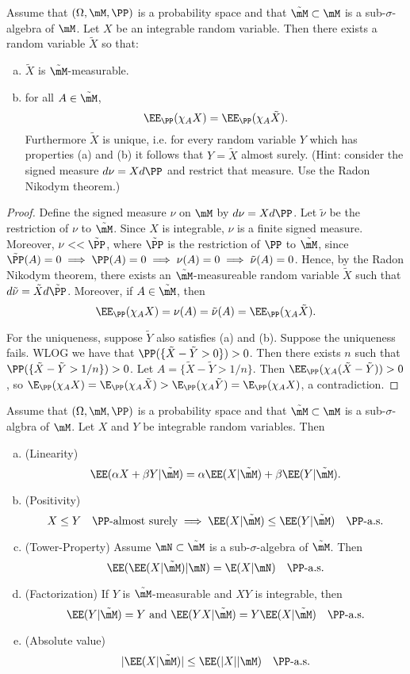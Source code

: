 \documentclass{article}
\begin{document}
 Assume that $(\Omega, \mM, {\PP})$ is a probability space and that $\tilde \mM \subset \mM$ is a sub-$\sigma$-algebra of $\mM$. Let $X$ be an integrable random variable. Then there exists a random variable $\tilde X$ so that:
\begin{enumerate}[a)]
\item $\tilde X$ is $\tilde \mM$-measurable.
\item for all $A \in \tilde \mM$,
$$\EE_{{\PP}} (\chi_A X) = \EE_{\PP}(\chi_A \tilde X).$$
Furthermore $\tilde X$ is unique, i.e. for every random variable $Y$ which has properties (a) and (b) it follows that $Y = \tilde X$ almost surely. (Hint: consider the signed measure $d\nu = X d{\PP}$ and restrict that measure.  Use the Radon Nikodym theorem.)
\end{enumerate}
\begin{proof}
Define the signed measure $\nu$ on $\mM$ by $d\nu = X d{\PP}$. Let $\tilde \nu$ be the restriction of $\nu$ to $\tilde \mM$. Since $X$ is integrable, $\nu$ is a finite signed measure.  Moreover, $\nu << \tilde {\PP}$, where $\tilde {\PP}$ is the restriction of ${\PP}$ to $\tilde \mM$, since $\tilde {\PP}(A) = 0 \implies {\PP}(A) = 0 \implies \nu(A) = 0 \implies \tilde \nu(A) = 0$.  Hence, by the Radon Nikodym theorem, there exists an $\tilde \mM$-measureable random variable $\tilde X$ such that $d \tilde \nu = \tilde X d \tilde {\PP}$. Moreover, if $A \in \tilde \mM$, then 
$$\EE_{\PP}(\chi_A X) = \nu(A) = \tilde \nu(A) = \EE_{\PP}(\chi_A \tilde X).$$

For the uniqueness, suppose $\tilde Y$ also satisfies (a) and (b). Suppose the uniqueness fails.  WLOG we have that ${\PP}(\{\tilde X - \tilde Y > 0\}) > 0$. Then there exists $n$ such that ${\PP}(\{\tilde X - \tilde Y > 1/n\}) > 0$.  Let $A = \{\tilde X - \tilde Y > 1/n\}$.  Then $\EE_{\PP}(\chi_A (\tilde X - \tilde Y)) > 0$, so $\E_{\PP}(\chi_A X) = \E_{\PP}(\chi_A \tilde X) > \E_{\PP}(\chi_A \tilde Y) = \E_{\PP}(\chi_A X)$, a contradiction.
\end{proof}


 Assume that $(\Omega, \mM , {\PP})$ is a probability space and that $\tilde \mM \subset \mM$ is a sub-$\sigma$-algbra of $\mM$. Let $X$ and $Y$ be integrable random variables. Then
\begin{enumerate}[a)]
\item (Linearity)
$$\EE(\alpha X + \beta Y | \tilde \mM) = \alpha \EE(X | \tilde \mM) + \beta \EE(Y | \tilde \mM).$$
\item (Positivity)
$$X \le Y \quad \text{${\PP}$-almost surely} \implies \EE(X | \tilde \mM) \le \EE(Y | \tilde \mM) \quad \text{${\PP}$-a.s.}$$
\item (Tower-Property) Assume $\mN \subset \tilde \mM$ is a sub-$\sigma$-algebra of $\tilde \mM$. Then
$$\EE(\EE(X | \tilde \mM) | \mN) = \E(X | \mN) \quad \text{${\PP}$-a.s.}$$
\item (Factorization) If $Y$ is $\tilde \mM$-measurable and $XY$ is integrable, then
$$\EE(Y | \tilde \mM) = Y \text{ and } \EE(YX | \tilde \mM) = Y \EE(X | \tilde \mM) \quad \text{${\PP}$-a.s.} $$
\item (Absolute value)
$$|\EE(X | \tilde \mM)| \le \EE(|X||\mM) \quad \text{${\PP}$-a.s.}$$
\end{enumerate}
\end{document}
